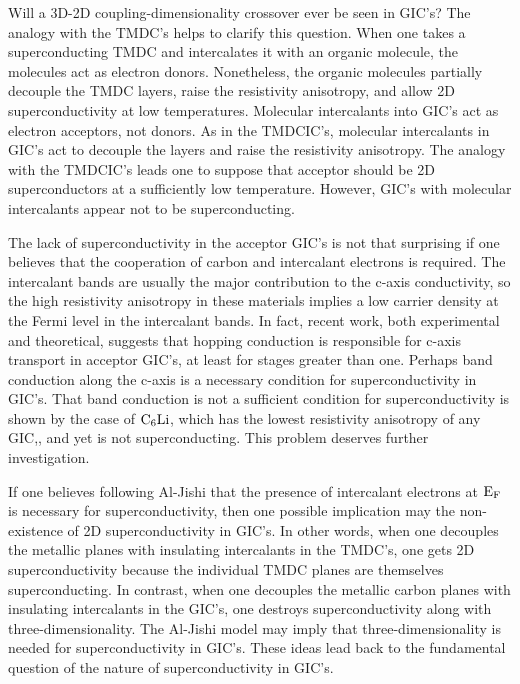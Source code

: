         Will  a 3D-2D coupling-dimensionality  crossover  ever  be  seen in
GIC's?  The analogy with the TMDC's helps  to clarify this  question.  When
one  takes  a  superconducting TMDC  and  intercalates it   with an organic
molecule,  the    molecules    act  as   electron  donors.\cite{thompson72}
Nonetheless,  the organic  molecules  partially  decouple the TMDC  layers,
raise the   resistivity   anisotropy,\cite{thompson72} and     allow     2D
superconductivity   at low       temperatures.\cite{coleman83}    Molecular
intercalants into GIC's act as electron acceptors, not donors.\cite{I94} As
in the TMDCIC's, molecular intercalants in GIC's act  to decouple the layers
and raise the  resistivity  anisotropy.\cite{mcrae88} The analogy with  the
TMDCIC's leads one to suppose that acceptor should be 2D superconductors at
a sufficiently low temperature.  However, GIC's with molecular intercalants
appear  not to be   superconducting.\cite{erice:scy}  

        The  lack of superconductivity  in  the acceptor GIC's  is not that
surprising if one believes  that the cooperation  of carbon and intercalant
electrons is required.  The intercalant   bands  are  usually the   major
contribution to the c-axis conductivity, so the high resistivity anisotropy
in these materials implies a low carrier density  at the Fermi level in the
intercalant bands.   In fact,  recent work, both experimental\cite{mcrae88}
and theoretical,\cite{E343,M325} suggests   that   hopping  conduction   is
responsible  for c-axis transport  in acceptor GIC's,  at least  for stages
greater than one.  Perhaps band conduction along the c-axis  is a necessary
condition  for superconductivity in  GIC's.   That band conduction is not a
sufficient condition for superconductivity is  shown by the case   of  $\rm
C_6Li$,   which   has   the     lowest resistivity anisotropy     of    any
GIC,\cite{mcrae88},  and  yet is not superconducting.\cite{erice:scy}  This
problem deserves further investigation.

        If one believes  following Al-Jishi\cite{M143} that the presence of
intercalant electrons at $\rm E_F$ is necessary for superconductivity, then
one possible implication may the  non-existence of 2D superconductivity  in
GIC's.  In other  words,  when one  decouples  the  metallic  planes   with
insulating  intercalants  in the   TMDC's,  one  gets  2D superconductivity
because the  individual  TMDC planes  are themselves   superconducting.  In
contrast,  when one decouples the metallic  carbon  planes  with insulating
intercalants  in the  GIC's,  one   destroys superconductivity along   with
three-dimensionality.    The      Al-Jishi    model     may   imply    that
three-dimensionality is needed for superconductivity in GIC's.  These ideas
lead back to the fundamental question of the nature of superconductivity in
GIC's.

